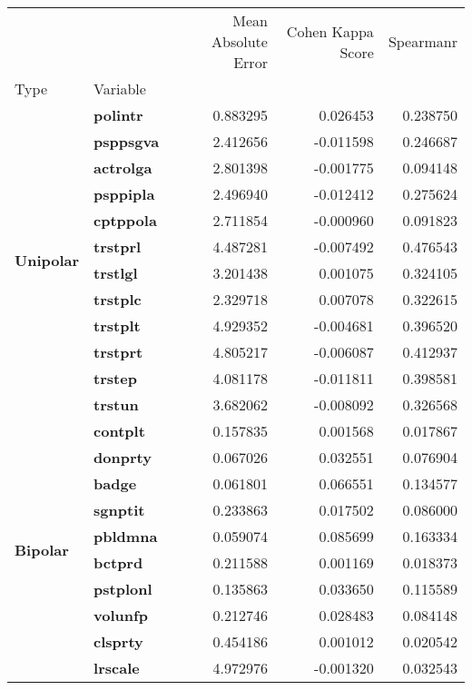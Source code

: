 \begin{table}[H]
\begin{tabular}{llrrr}
\toprule
 &  & Mean Absolute Error & Cohen Kappa Score & Spearmanr \\
Type & Variable &  &  &  \\
\midrule
\multirow[t]{12}{*}{\textbf{Unipolar}} & \textbf{polintr} & 0.883295 & 0.026453 & 0.238750 \\
\textbf{} & \textbf{psppsgva} & 2.412656 & -0.011598 & 0.246687 \\
\textbf{} & \textbf{actrolga} & 2.801398 & -0.001775 & 0.094148 \\
\textbf{} & \textbf{psppipla} & 2.496940 & -0.012412 & 0.275624 \\
\textbf{} & \textbf{cptppola} & 2.711854 & -0.000960 & 0.091823 \\
\textbf{} & \textbf{trstprl} & 4.487281 & -0.007492 & 0.476543 \\
\textbf{} & \textbf{trstlgl} & 3.201438 & 0.001075 & 0.324105 \\
\textbf{} & \textbf{trstplc} & 2.329718 & 0.007078 & 0.322615 \\
\textbf{} & \textbf{trstplt} & 4.929352 & -0.004681 & 0.396520 \\
\textbf{} & \textbf{trstprt} & 4.805217 & -0.006087 & 0.412937 \\
\textbf{} & \textbf{trstep} & 4.081178 & -0.011811 & 0.398581 \\
\textbf{} & \textbf{trstun} & 3.682062 & -0.008092 & 0.326568 \\
\cline{1-5}
\multirow[t]{29}{*}{\textbf{Bipolar}} & \textbf{contplt} & 0.157835 & 0.001568 & 0.017867 \\
\textbf{} & \textbf{donprty} & 0.067026 & 0.032551 & 0.076904 \\
\textbf{} & \textbf{badge} & 0.061801 & 0.066551 & 0.134577 \\
\textbf{} & \textbf{sgnptit} & 0.233863 & 0.017502 & 0.086000 \\
\textbf{} & \textbf{pbldmna} & 0.059074 & 0.085699 & 0.163334 \\
\textbf{} & \textbf{bctprd} & 0.211588 & 0.001169 & 0.018373 \\
\textbf{} & \textbf{pstplonl} & 0.135863 & 0.033650 & 0.115589 \\
\textbf{} & \textbf{volunfp} & 0.212746 & 0.028483 & 0.084148 \\
\textbf{} & \textbf{clsprty} & 0.454186 & 0.001012 & 0.020542 \\
\textbf{} & \textbf{lrscale} & 4.972976 & -0.001320 & 0.032543 \\

\end{tabular}
\end{table}

